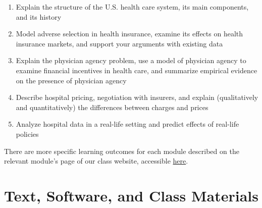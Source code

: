 \documentclass[11pt,]{article}
\begin{document}
\begin{enumerate}
\def\labelenumi{\arabic{enumi}.}
\item
  Explain the structure of the U.S. health care system, its main
  components, and its history
\item
  Model adverse selection in health insurance, examine its effects on
  health insurance markets, and support your arguments with existing
  data
\item
  Explain the physician agency problem, use a model of physician agency
  to examine financial incentives in health care, and summarize
  empirical evidence on the presence of physician agency
\item
  Describe hospital pricing, negotiation with insurers, and explain
  (qualitatively and quantitatively) the differences between charges and
  prices
\item
  Analyze hospital data in a real-life setting and predict effects of
  real-life policies
\end{enumerate}

There are more specific learning outcomes for each module described on
the relevant module's page of our class website, accessible
\href{https://mccarthy-spring21-econ372.netlify.app}{here}.

\hypertarget{text-software-and-class-materials}{%
\section{Text, Software, and Class
Materials}\label{text-software-and-class-materials}}
\end{document}
